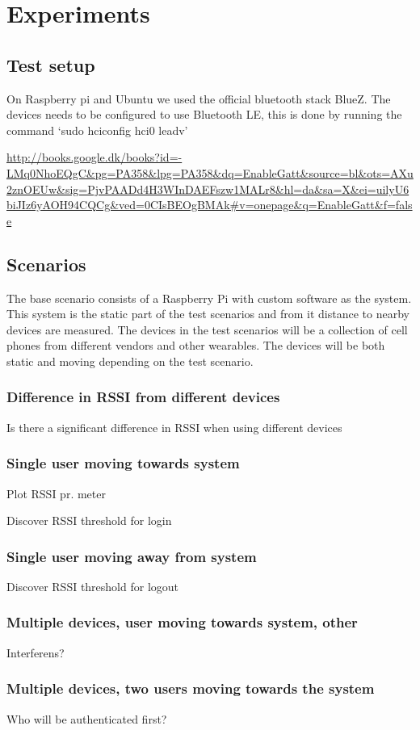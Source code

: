 \section{Experiments}

\subsection{Test setup}

On Raspberry pi and Ubuntu we used the official bluetooth stack BlueZ.
The devices needs to be configured to use Bluetooth LE, this is done by running the command ‘sudo hciconfig hci0 leadv’

\url{http://books.google.dk/books?id=-LMq0NhoEQgC&pg=PA358&lpg=PA358&dq=EnableGatt&source=bl&ots=AXu2znOEUw&sig=PjvPAADd4H3WInDAEFszw1MALr8&hl=da&sa=X&ei=uilyU6biJIz6yAOH94CQCg&ved=0CIsBEOgBMAk#v=onepage&q=EnableGatt&f=false}

\subsection{Scenarios}

The base scenario consists of a Raspberry Pi with custom software as the system.
This system is the static part of the test scenarios and from it distance to nearby devices are measured.
The devices in the test scenarios will be a collection of cell phones from different vendors and other wearables.
The devices will be both static and moving depending on the test scenario.


\subsubsection{Difference in RSSI from different devices}
Is there a significant difference in RSSI when using different devices

\subsubsection{Single user moving towards system}
Plot RSSI pr. meter

Discover RSSI threshold for login

\subsubsection{Single user moving away from system}
Discover RSSI threshold for logout

\subsubsection{Multiple devices, user moving towards system, other}
Interferens?

\subsubsection{Multiple devices, two users moving towards the system}
Who will be authenticated first?
